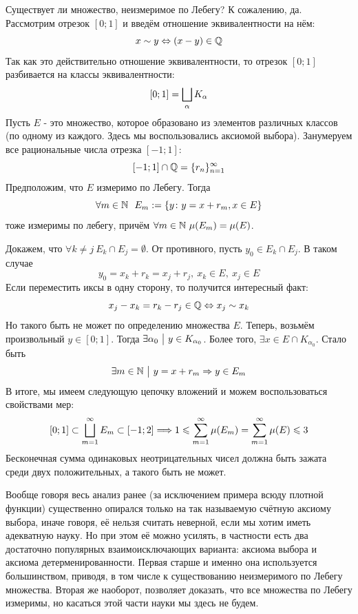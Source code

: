 \begin{example}
	Существует ли множество, неизмеримое по Лебегу? К сожалению, да. Рассмотрим отрезок $[0; 1]$ и введём отношение эквивалентности на нём:
	\[
		x \sim y \Leftrightarrow (x - y) \in \mathbb{Q}
	\]
	Так как это действительно отношение эквивалентности, то отрезок $[0; 1]$ разбивается на классы эквивалентности:
	\[
		[0; 1] = \bigsqcup_{\alpha} K_\alpha
	\]
	Пусть $E$ - это множество, которое образовано из элементов различных классов (по одному из каждого. Здесь мы воспользовались аксиомой выбора). Занумеруем все рациональные числа отрезка $[-1; 1]$:
	\[
		[-1; 1] \cap \mathbb{Q} = \{r_n\}_{n = 1}^\infty
	\]
	Предположим, что $E$ измеримо по Лебегу. Тогда
	\[
		\forall m \in \N\ \ E_m := \{y \colon y = x + r_m, x \in E\}
	\]
	тоже измеримы по лебегу, причём $\forall m \in \mathbb{N}\ \mu(E_m) = \mu(E)$.
	
	Докажем, что $\forall k \neq j\ E_k \cap E_j = \emptyset$. От противного, пусть $y_0 \in E_k \cap E_j$. В таком случае
	\[
		y_0 = x_k + r_k = x_j + r_j,\ x_k \in E,\ x_j \in E
	\]
	Если переместить иксы в одну сторону, то получится интересный факт:
	\[
		x_j - x_k = r_k - r_j \in \mathbb{Q} \Leftrightarrow x_j \sim x_k
	\]
	Но такого быть не может по определению множества $E$. Теперь, возьмём произвольный $y \in [0; 1]$. Тогда $\exists \alpha_0 \ \big|\  y \in K_{\alpha_0}$. Более того, $\exists x \in E \cap K_{\alpha_0}$. Стало быть
	\[
		\exists m \in \mathbb{N} \ \big|\  y = x + r_m \Rightarrow y \in E_m
	\]
	В итоге, мы имеем следующую цепочку вложений и можем воспользоваться свойствами мер:
	\[
		[0; 1] \subset \bigsqcup_{m = 1}^\infty E_m \subset [-1; 2] \Longrightarrow 1 \leqslant \sum_{m = 1}^\infty \mu(E_m) = \sum_{m = 1}^\infty \mu(E) \leqslant 3
	\]
	Бесконечная сумма одинаковых неотрицательных чисел должна быть зажата среди двух положительных, а такого быть не может.
\end{example}

\begin{note}
	Вообще говоря весь анализ ранее (за исключением примера всюду плотной функции) существенно опирался только на так называемую счётную аксиому выбора, иначе говоря, её нельзя считать неверной, если мы хотим иметь адекватную науку. Но при этом её можно усилять, в частности есть два достаточно популярных взаимоисключающих варианта: аксиома выбора и аксиома детерменированности. Первая старше и именно она используется большинством, приводя, в том числе к существованию неизмеримого по Лебегу множества. Вторая же наоборот, позволяет доказать, что все множества по Лебегу измеримы, но касаться этой части науки мы здесь не будем.
\end{note}

